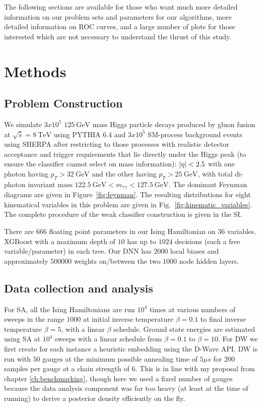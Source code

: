 The following sections are available for those who want much more detailed information on our problem sets and parameters for our algorithms, more detailed information on ROC curves, and a large number of plots for those interested which are not necessary to understand the thrust of this study.
%

\section{Methods}

\subsection{Problem Construction}
We simulate $3x10^5$ $\SI{125}{\giga\electronvolt}$ mass Higgs particle decays produced by gluon fusion at $\sqrt{\hat{s}} = \SI{8}{\tera\electronvolt}$ using PYTHIA 6.4 \cite{Pythia:2006} and $3x10^5$ SM-process background events using SHERPA \cite{Sherpa:2009} after restricting to those processes with realistic detector acceptance and trigger requirements that lie directly under the Higgs peak (to ensure the classifier cannot select on mass information): $\abs{\eta}<2.5$ with one photon having $p_T>\SI{32}{\giga\electronvolt}$ and the other having $p_T>\SI{25}{\giga\electronvolt}$, with total di-photon invariant mass $\SI{122.5}{\giga\electronvolt} < m_{\gamma\gamma} < \SI{127.5}{\giga\electronvolt}$. The dominant Feynman diagrams
are given in Figure~\ref{fig:feynman}. The resulting distributions for eight kinematical variables in this problem are given in Fig.~\ref{fig:kinematic_variables}. The complete procedure of the weak classifier construction is given in the SI.

There are $666$ floating point parameters in our Ising Hamiltonian on $36$ variables. XGBoost with a maximum depth of $10$ has up to $1024$ decisions (each a free variable/parameter) in each tree. Our DNN has $2000$ local biases and approximately $500000$ weights on/between the two $1000$ node hidden layers.



\subsection{Data collection and analysis}
For SA, all the Ising Hamiltonians are run $10^4$ times at various numbers of sweeps in the range $1000$ at initial inverse temperature $\beta=0.1$ to final inverse temperature $\beta=5$, with a linear $\beta$ schedule. Ground state energies are  estimated using SA at $10^4$ sweeps with a linear schedule from $\beta=0.1$ to $\beta=10$.
For DW we first create for each instance a heuristic embedding using the D-Wave API.  DW is run with $50$ gauges \cite{q-sig2} at the minimum possible annealing time of $5\mu s$ for $200$ samples per gauge at a chain strength of $6$. This is in line with my proposal from chapter \ref{ch:benchmarking}, though here we used a fixed number of gauges because the data analysis component was far too heavy (at least at the time of running) to derive a posterior density efficiently on the fly.

